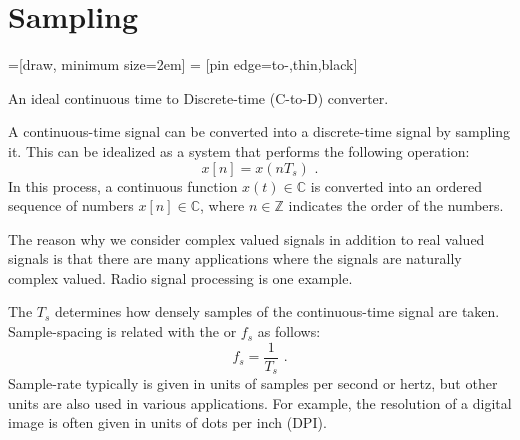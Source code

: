 \section{Sampling}
\begin{marginfigure}
=[draw, minimum size=2em]
 = [pin edge={to-,thin,black}]
\begin{center}
\end{center}
\caption{An ideal continuous time to Discrete-time (C-to-D) converter.}
\end{marginfigure}


A continuous-time signal can be converted into a discrete-time signal
by sampling it. This can be idealized as a system that performs the following operation:
\begin{equation}
  \boxed{
    x[n] = x(n T_s)
    }\,\,.
\end{equation}
In this process, a continuous function $x(t) \in \mathbb{C}$ is converted into an ordered sequence of numbers $x[n] \in \mathbb{C}$, where $n\in\mathbb{Z}$ indicates the order of the numbers.

The reason why we consider complex valued signals in addition to real valued signals is that there are many applications where the signals are naturally complex valued. Radio signal processing is one example. 

The  $T_s$ determines how densely samples of the continuous-time signal are taken. Sample-spacing is related with the  or  $f_s$ as follows:
\begin{equation}
  \boxed{
    f_s = \frac{1}{T_s}
    }\,\,.
\end{equation}
Sample-rate typically is given in units of samples per second or hertz, but other units are also used in various applications. 
For example, the resolution of a digital image is often given in units of dots per inch (DPI).

